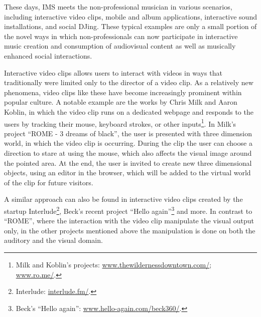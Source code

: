 \documentclass[a4paper,11pt]{article}
\begin{document}
These days, IMS meets the non-professional musician in various scenarios, including interactive video clips, mobile and album applications, interactive sound installations, and social DJing.
These typical examples are only a small portion of the novel ways in which non-professionals can now participate in interactive music creation and consumption of audiovisual content as well as musically enhanced social interactions.

Interactive video clips allows users to interact with videos in ways that traditionally were limited only to the director of a video clip.
As a relatively new phenomena, video clips like these have become increasingly prominent within popular culture.
A notable example are the works by Chris Milk and Aaron Koblin, in which the video clip runs on a dedicated webpage and responds to the users by tracking their mouse, keyboard strokes, or other inputs\footnote{Milk and Koblin's projects: \href{http://www.thewildernessdowntown.com/}{www.thewildernessdowntown.com/}; \href{http://www.ro.me/}{www.ro.me/}.}.
In Milk's project ``ROME - 3 dreams of black'', the user is presented with three dimension world, in which the video clip is occurring.
During the clip the user can choose a direction to stare at using the mouse, which also affects the visual image around the pointed area.
At the end, the user is invited to create new three dimensional objects, using an editor in the browser, which will be added to the virtual world of the clip for future visitors.

A similar approach can also be found in interactive video clips created by the startup Interlude\footnote{Interlude: \href{http://interlude.fm/}{interlude.fm/}.}, Beck's recent project ``Hello again''\footnote{Beck's ``Hello again'': \href{http://www.hello-again.com/beck360/}{www.hello-again.com/beck360/}.} and more.
In contrast to ``ROME'', where the interaction with the video clip manipulate the visual output only, in the other projects mentioned above the manipulation is done on both the auditory and the visual domain.
\end{document}
